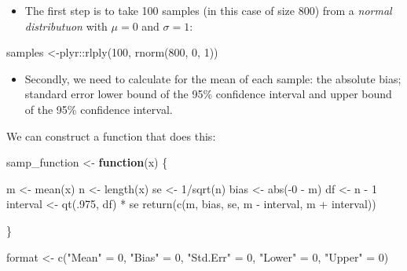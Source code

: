 \documentclass[
]{book}
\newenvironment{Shaded}{\begin{snugshade}}{\end{snugshade}}
\newcommand{\ControlFlowTok}[1]{\textcolor[rgb]{0.13,0.29,0.53}{\textbf{#1}}}
\newcommand{\DecValTok}[1]{\textcolor[rgb]{0.00,0.00,0.81}{#1}}
\newcommand{\FunctionTok}[1]{\textcolor[rgb]{0.00,0.00,0.00}{#1}}
\newcommand{\NormalTok}[1]{#1}
\newcommand{\OtherTok}[1]{\textcolor[rgb]{0.56,0.35,0.01}{#1}}
\newcommand{\SpecialCharTok}[1]{\textcolor[rgb]{0.00,0.00,0.00}{#1}}
\newcommand{\StringTok}[1]{\textcolor[rgb]{0.31,0.60,0.02}{#1}}
\providecommand{\tightlist}{%
  \setlength{\itemsep}{0pt}\setlength{\parskip}{0pt}}
\begin{document}
\begin{itemize}
\tightlist
\item
  The first step is to take 100 samples (in this case of size 800) from a \emph{normal distributuon} with \(\mu = 0\) and \(\sigma = 1\):
\end{itemize}

\begin{Shaded}
\begin{Highlighting}[]
\NormalTok{samples }\OtherTok{\textless{}{-}}\NormalTok{plyr}\SpecialCharTok{::}\FunctionTok{rlply}\NormalTok{(}\DecValTok{100}\NormalTok{, }\FunctionTok{rnorm}\NormalTok{(}\DecValTok{800}\NormalTok{, }\DecValTok{0}\NormalTok{, }\DecValTok{1}\NormalTok{))}
\end{Highlighting}
\end{Shaded}

\begin{itemize}
\tightlist
\item
  Secondly, we need to calculate for the mean of each sample: the absolute bias; standard error lower bound of the 95\% confidence interval and upper bound of the 95\% confidence interval.
\end{itemize}

We can construct a function that does this:

\begin{Shaded}
\begin{Highlighting}[]
\NormalTok{samp\_function }\OtherTok{\textless{}{-}} \ControlFlowTok{function}\NormalTok{(x) \{}
 
\NormalTok{  m }\OtherTok{\textless{}{-}} \FunctionTok{mean}\NormalTok{(x)}
\NormalTok{  n }\OtherTok{\textless{}{-}} \FunctionTok{length}\NormalTok{(x)}
\NormalTok{  se }\OtherTok{\textless{}{-}} \DecValTok{1}\SpecialCharTok{/}\FunctionTok{sqrt}\NormalTok{(n)}
\NormalTok{  bias }\OtherTok{\textless{}{-}} \FunctionTok{abs}\NormalTok{(}\SpecialCharTok{{-}}\DecValTok{0} \SpecialCharTok{{-}}\NormalTok{ m)}
\NormalTok{  df }\OtherTok{\textless{}{-}}\NormalTok{ n }\SpecialCharTok{{-}} \DecValTok{1}
\NormalTok{  interval }\OtherTok{\textless{}{-}} \FunctionTok{qt}\NormalTok{(.}\DecValTok{975}\NormalTok{, df) }\SpecialCharTok{*}\NormalTok{ se}
  \FunctionTok{return}\NormalTok{(}\FunctionTok{c}\NormalTok{(m, bias, se, m }\SpecialCharTok{{-}}\NormalTok{ interval, m }\SpecialCharTok{+}\NormalTok{ interval))}

\NormalTok{\}}

\NormalTok{format }\OtherTok{\textless{}{-}} \FunctionTok{c}\NormalTok{(}\StringTok{"Mean"} \OtherTok{=} \DecValTok{0}\NormalTok{, }\StringTok{"Bias"} \OtherTok{=} \DecValTok{0}\NormalTok{, }\StringTok{"Std.Err"} \OtherTok{=} \DecValTok{0}\NormalTok{, }\StringTok{"Lower"} \OtherTok{=} \DecValTok{0}\NormalTok{, }\StringTok{"Upper"} \OtherTok{=} \DecValTok{0}\NormalTok{)}
\end{Highlighting}
\end{Shaded}
\end{document}
